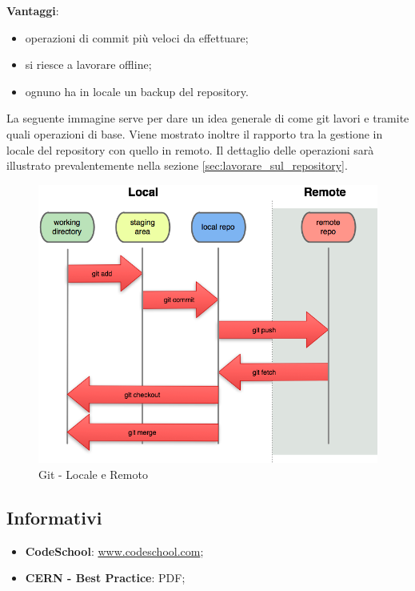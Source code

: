 \noindent
\textbf{Vantaggi}:
	\begin{itemize}
		\item operazioni di commit più veloci da effettuare;
		\item si riesce a lavorare offline;
		\item ognuno ha in locale un backup del repository.
	\end{itemize}
	\noindent
	\newline
La seguente immagine serve per dare un idea generale di come git lavori e tramite quali operazioni di base. Viene mostrato inoltre il rapporto tra la gestione in locale del repository con quello in remoto. Il dettaglio delle operazioni sarà illustrato prevalentemente nella sezione \ref{sec:lavorare_sul_repository}.

	\begin{figure}[htbp]
		\centering
		\includegraphics[scale=1.1]{images/git_local_remote.png}
		\caption{Git - Locale e Remoto}
		\label{fig:git_locale_e_remoto}
	\end{figure}


	\subsection{Informativi} %
	\label{sub:informativi}
		\begin{itemize}
			\item \textbf{CodeSchool}: \url{www.codeschool.com};
			\item \textbf{CERN - Best Practice}: PDF;
		\end{itemize}

